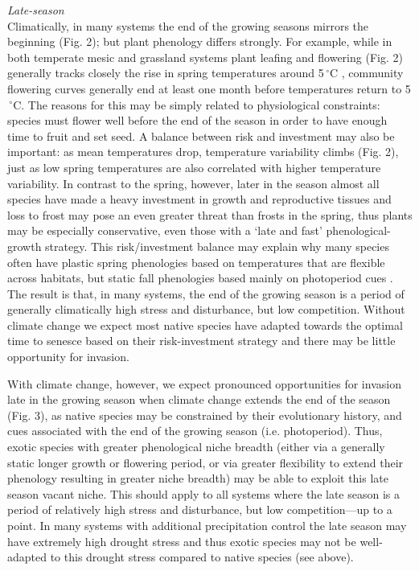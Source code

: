 \documentclass[11pt,a4paper,oneside]{article}
\begin{document}
\noindent \emph{Late-season}\\
\noindent Climatically, in many systems the end of the growing seasons mirrors the beginning (Fig. 2); but plant phenology differs strongly. For example, while in both temperate mesic and grassland systems plant leafing and flowering (Fig. 2) generally tracks closely the rise in spring temperatures around 5$\,^{\circ}\mathrm{C}$  \citep{larcher2003}, community flowering curves generally end at least one month before temperatures return to 5$\,^{\circ}\mathrm{C}$. The reasons for this may be simply related to physiological constraints: species must flower well before the end of the season in order to have enough time to fruit and set seed. A balance between risk and investment may also be important: as mean temperatures drop, temperature variability climbs (Fig. 2), just as low spring temperatures are also correlated with higher temperature variability. In contrast to the spring, however, later in the season almost all species have made a heavy investment in growth and reproductive tissues and loss to frost may pose an even greater threat than frosts in the spring, thus plants may be especially conservative, even those with a `late and fast' phenological-growth strategy. This risk/investment balance may explain why many species often have plastic spring phenologies based on temperatures that are flexible across habitats, but static fall phenologies based mainly on photoperiod cues \citep{Howe:2003}. The result is that, in many systems, the end of the growing season is a period of generally climatically high stress and disturbance, but low competition. Without climate change we expect most native species have adapted towards the optimal time to senesce based on their risk-investment strategy and there may be little opportunity for invasion.

With climate change, however, we expect pronounced opportunities for invasion late in the growing season when climate change extends the end of the season (Fig. 3), as native species may be constrained by their evolutionary history, and cues associated with the end of the growing season (i.e. photoperiod). Thus, exotic species with greater phenological niche breadth (either via a generally static longer growth or flowering period, or via greater flexibility to extend their phenology resulting in greater niche breadth) may be able to exploit this late season vacant niche. This should apply to all systems where the late season is a period of relatively high stress and disturbance, but low competition---up to a point. In many systems with additional precipitation control the late season may have extremely high drought stress and thus exotic species may not be well-adapted to this drought stress compared to native species (see above).\\
\end{document}

